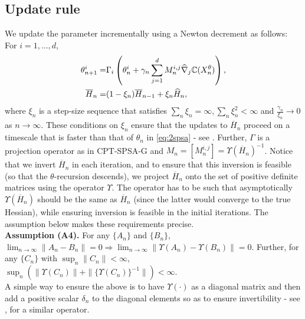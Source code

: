 \documentclass{article}
\numberwithin{equation}{section}
\numberwithin{theorem}{section}
\begin{document}
\subsection{Update rule}
We update the parameter incrementally using a Newton decrement as follows: For $i=1,\ldots,d$,
\begin{align}
\label{eq:2spsa}
\theta^{i}_{n+1} =& \Gamma_{i}\left(\theta^{i}_n + \gamma_n \sum_{j=1}^{d} M_n^{i,j} \widehat \nabla_{j} \mathbb{C}(X^\theta_n)\right), \\
\overline H_n = & (1-\xi_n) \overline H_{n-1} + \xi_n \widehat H_n,\label{eq:2spsa-H}
\end{align}
where $\xi_n$ is a step-size sequence that satisfies 
$\sum_{n} \xi_n = \infty, \sum_n \xi_n^2 < \infty$ and $\frac{\gamma_n}{\xi_n}\rightarrow 0$ as $n\rightarrow \infty$. These conditions on $\xi_n$ ensure that the updates to $\overline H_n$ proceed on a timescale that is faster than that of $\theta_n$ in \eqref{eq:2spsa} - see \cite[Chapter 6]{borkar2008stochastic}.
Further, $\Gamma$ is a projection operator as in CPT-SPSA-G and  $M_n = [M_n^{i,j}] = \Upsilon(\overline H_n)^{-1}$.
Notice that we invert $\overline H_n$ in each iteration, and to ensure that this inversion is feasible (so that the $\theta$-recursion descends), we project $\overline H_n$ onto the set of positive definite matrices using the operator $\Upsilon$. The operator has to be such that asymptotically $\Upsilon(\overline H_n)$ should be the same as $\overline H_n$ (since the latter would converge to the true Hessian), while ensuring inversion is feasible in the initial iterations.  The assumption below makes these requirements precise.\\[1ex]
\textbf{Assumption (A4).}  For any $\{A_n\}$ and $\{B_n\}$,
${\displaystyle \lim_{n\rightarrow \infty} \left\| A_n-B_n \right\|}= 0 \Rightarrow {\displaystyle \lim_{n\rightarrow \infty} \parallel \Upsilon(A_n)- \Upsilon(B_n) \parallel}= 0$. Further, for any $\{C_n\}$  with
${\displaystyle \sup_n \parallel C_n\parallel}<\infty$,
${\displaystyle \sup_n \left(\parallel \Upsilon(C_n)\parallel + \parallel \{\Upsilon(C_n)\}^{-1} \parallel\right) < \infty}$.
\\[0.5ex]
A simple way to ensure the above is to have $\Upsilon(\cdot)$ as a diagonal matrix and then add a positive scalar $\delta_n$ to the diagonal elements so as to ensure invertibility  - see \cite{gill1981practical}, \cite{spall2000adaptive} for a similar operator.
\end{document}
